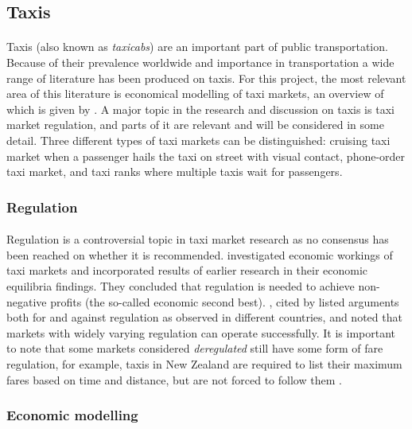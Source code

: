 \subsection{Taxis}
\label{sec:literature:taxis}

\paragraph{} Taxis (also known as \textit{taxicabs}) are an important part of
public transportation. Because of their prevalence worldwide and importance in
transportation a wide range of literature has been produced on taxis. For this
project, the most relevant area of this literature is economical modelling of
taxi markets, an overview of which is given by
\textcite{Salanova2011taxi+review}. A major topic in the research and
discussion on taxis is taxi market regulation, and parts of it are relevant and
will be considered in some detail. Three different types of taxi markets can be
distinguished: cruising taxi market when a passenger hails the taxi on street
with visual contact, phone-order taxi market, and taxi ranks where multiple
taxis wait for passengers.

\subsubsection{Regulation}

\paragraph{}Regulation is a controversial topic in taxi market research as no
consensus has been reached on whether it is recommended.
\textcite{Cairns1996taxi+competition} investigated economic workings of taxi
markets and incorporated results of earlier research in their economic
equilibria findings. They concluded that regulation is needed to achieve non-
negative profits (the so-called economic second best).
\textcite{Oecd2007taxi+policy}, cited by \textcite{Salanova2011taxi+review}
listed arguments both for and against regulation as observed in different
countries, and noted that markets with widely varying regulation can operate
successfully. It is important to note that some markets considered
\textit{deregulated} still have some form of fare regulation, for example,
taxis in New Zealand are required to list their maximum fares based on time and
distance, but are not forced to follow them
\parencite{Gaunt1995taxi+newzealand}.

\subsubsection{Economic modelling} 
\label{sec:literature:taxis:modelling}

